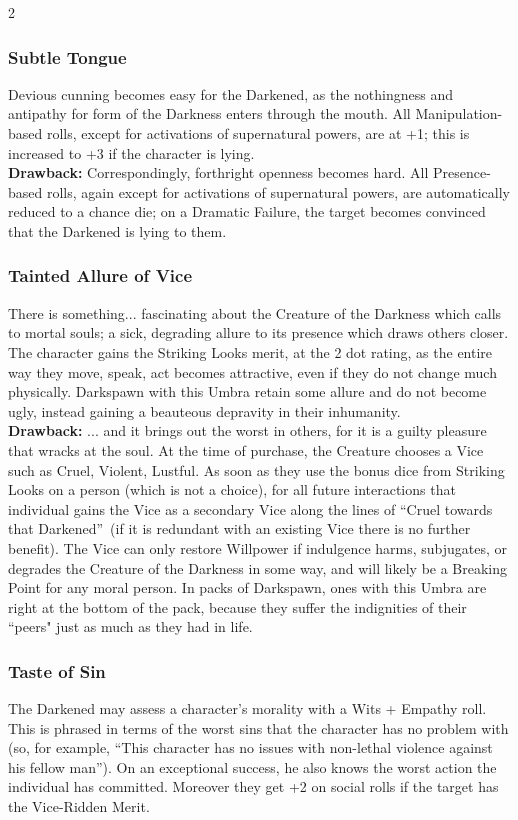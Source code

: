 \begin{multicols}{2}
\subsubsection*{Subtle Tongue}
Devious cunning becomes easy for the Darkened, as the nothingness and antipathy for form of the Darkness enters through the mouth. All Manipulation-based rolls, except for activations of supernatural powers, are at +1; this is increased to +3 if the character is lying. \\

\noindent \textbf{Drawback:} Correspondingly, forthright openness becomes hard. All Presence-based rolls, again except for activations of supernatural powers, are automatically reduced to a chance die; on a Dramatic Failure, the target becomes convinced that the Darkened is lying to them. 
 
\subsubsection*{Tainted Allure of Vice}
There is something... fascinating about the Creature of the Darkness which calls to mortal souls; a sick, degrading allure to its presence which draws others closer. The character gains the Striking Looks merit, at the 2 dot rating, as the entire way they move, speak, act becomes attractive, even if they do not change much physically. Darkspawn with this Umbra retain some allure and do not become ugly, instead gaining a beauteous depravity in their inhumanity. \\

\noindent \textbf{Drawback:} ... and it brings out the worst in others, for it is a guilty pleasure that wracks at the soul. At the time of purchase, the Creature chooses a Vice such as Cruel, Violent, Lustful. As soon as they use the bonus dice from Striking Looks on a person (which is not a choice), for all future interactions that individual gains the Vice as a secondary Vice along the lines of \textquotedblleft Cruel towards that Darkened\textquotedblright\, (if it is redundant with an existing Vice there is no further benefit). The Vice can only restore Willpower if indulgence harms, subjugates, or degrades the Creature of the Darkness in some way, and will likely be a Breaking Point for any moral person. In packs of Darkspawn, ones with this Umbra are right at the bottom of the pack, because they suffer the indignities of their \textquotedblleft peers" just as much as they had in life. 

\subsubsection*{Taste of Sin}
The Darkened may assess a character’s morality with a Wits + Empathy roll. This is phrased in terms of the worst sins that the character has no problem with (so, for example, “This character has no issues with non-lethal violence against his fellow man”). On an exceptional success, he also knows the worst action the individual has committed. Moreover they get +2 on social rolls if the target has the Vice-Ridden Merit.\\


\end{multicols}
